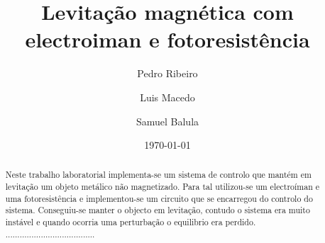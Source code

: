 \documentclass[%
  reprint,
  nofootinbib,
  amsmath,amssymb,
  aps,
  10pt,
  a4paper
]{revtex4-1}
\begin{document}


 

\title{Levitação magnética com electroiman e fotoresistência}

\author{Pedro Ribeiro}%
\author{Luis Macedo}%
\author{Samuel Balula}%



\date{\today}

\begin{abstract}
Neste trabalho laboratorial implementa-se um sistema de controlo que mantém em levitação um objeto metálico não magnetizado. Para tal utilizou-se um electroíman e uma fotoresistência e implementou-se um circuito que se encarregou do controlo do sistema. Conseguiu-se manter o objecto em levitação, contudo o sistema era muito instável e quando ocorria uma perturbação o equilibrio era perdido.
......................................


\end{abstract}
\maketitle
\end{document}
